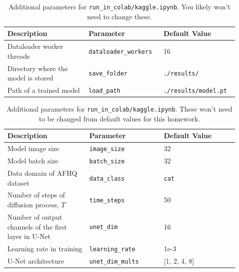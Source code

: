 \documentclass[11pt,addpoints,answers]{exam}
\begin{document}
\begin{questions}
\begin{table}[H]
\centering
\begin{tabular}{|p{0.33\linewidth}|p{0.3\linewidth}|p{0.3\linewidth}|}
\hline
Description & Parameter & Default Value \\ \hline
Dataloader worker threads  &  \lstinline|dataloader_workers| & 16 \\ \hline
Directory where the model is stored &  \lstinline|save_folder| & \lstinline|./results/| \\ \hline
Path of a trained model &  \lstinline|load_path| & \lstinline|./results/model.pt| \\ \hline

\end{tabular}
\caption{Additional parameters for \lstinline{run_in_colab/kaggle.ipynb}. You likely won't need to change these.}
\label{table:additional}
\end{table}

\vspace{-1em}

\begin{table}[H]
\centering
\begin{tabular}{|p{0.33\linewidth}|p{0.3\linewidth}|p{0.3\linewidth}|}
\hline
Description & Parameter & Default Value \\ \hline
Model image size &  \lstinline|image_size| & 32 \\ \hline
Model batch size &  \lstinline|batch_size | & 32 \\ \hline
Data domain of AFHQ dataset &  \lstinline|data_class| & \lstinline|cat| \\ \hline

Number of steps of diffusion process, $T$  &  \lstinline|time_steps| & 50 \\ \hline

Number of output channels of the first layer in U-Net  &  \lstinline|unet_dim| & 16 \\ \hline
Learning rate in training  &  \lstinline|learning_rate| & 1e-3 \\ \hline
U-Net architecture &  \lstinline|unet_dim_mults| & [1, 2, 4, 8] \\ \hline

\end{tabular}
\caption{Additional parameters for \lstinline{run_in_colab/kaggle.ipynb}. These won't need to be changed from default values for this homework.}
\label{table:default}
\end{table}



\end{questions}
\end{document}
